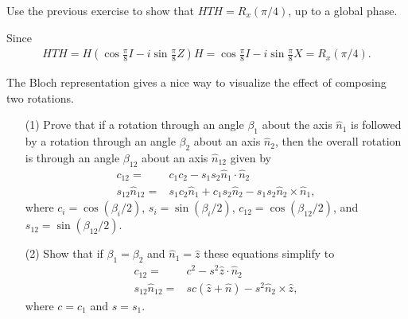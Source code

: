 \documentclass[en]{sol-man}
\begin{document}
\begin{exe}
    Use the previous exercise to show that $HTH=R_x(\pi/4)$, up to a global phase.
\end{exe}
\begin{pf}
    Since
    \begin{align}
        HTH=H\left(\cos\frac{\pi}{8}I-i\sin\frac{\pi}{8}Z\right)H=\cos\frac{\pi}{8}I-i\sin\frac{\pi}{8}X=R_x(\pi/4).
    \end{align}
\end{pf}

\begin{exe}
    The Bloch representation gives a nice way to visualize the effect of composing two rotations.
    \begin{itemize}
        \item[(1)] Prove that if a rotation through an angle $\beta_1$ about the axis $\hat{n}_1$ is followed by a rotation through an angle $\beta_2$ about an axis $\hat{n}_2$, then the overall rotation is through an angle $\beta_{12}$ about an axis $\hat{n}_{12}$ given by
        \begin{align}
            c_{12}=&c_1c_2-s_1s_2\hat{n}_1\cdot\hat{n}_2\\
            s_{12}\hat{n}_{12}=&s_1c_2\hat{n}_1+c_1s_2\hat{n}_2-s_1s_2\hat{n}_2\times\hat{n}_1,
        \end{align}
        where $c_i=\cos(\beta_i/2)$, $s_i=\sin(\beta_i/2)$, $c_{12}=\cos(\beta_{12}/2)$, and $s_{12}=\sin(\beta_{12}/2)$.
        \item[(2)] Show that if $\beta_1=\beta_2$ and $\hat{n}_1=\hat{z}$ these equations simplify to
        \begin{align}
            c_{12}=&c^2-s^2\hat{z}\cdot\hat{n}_2\\
            s_{12}\hat{n}_{12}=&sc(\hat{z}+\hat{n})-s^2\hat{n}_2\times\hat{z},
        \end{align}
        where $c=c_1$ and $s=s_1$.
    \end{itemize}
\end{exe}
\end{document}
